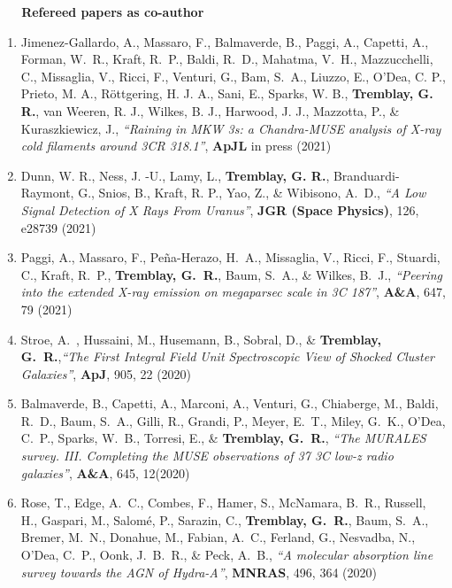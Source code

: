 \documentclass[11pt]{article}
\begin{document}
\vspace{4mm}

\noindent \textbf{~~~Refereed papers as co-author}

\begin{enumerate}[resume]

\item Jimenez-Gallardo, A., Massaro, F., Balmaverde, B., Paggi, A., Capetti, A., Forman, W.~R., Kraft, R.~P., Baldi, R.~D., Mahatma, V.~H., Mazzucchelli, C., Missaglia, V., Ricci, F., Venturi, G., Bam, S.~A., Liuzzo, E., O'Dea, C. P., Prieto, M. A., Röttgering, H. J. A., Sani, E., Sparks, W. B., \textbf{Tremblay, G. R.}, van Weeren, R. J., Wilkes, B. J., Harwood, J. J., Mazzotta, P., \& Kuraszkiewicz, J., \textit{``Raining in MKW 3s: a Chandra-MUSE analysis of X-ray cold filaments around 3CR 318.1''}, \textbf{ApJL} in press (2021)

\item Dunn, W. R., Ness, J. -U., Lamy, L., \textbf{Tremblay, G. R.}, Branduardi-Raymont, G., Snios, B., Kraft, R. P., Yao, Z., \& Wibisono, A.~D., \textit{``A Low Signal Detection of X Rays From Uranus''}, \textbf{JGR (Space Physics)}, 126, e28739 (2021)


\item Paggi, A., Massaro, F., Pe\~{n}a-Herazo, H.~A., Missaglia, V., Ricci, F., Stuardi, C., Kraft, R.~P., \textbf{Tremblay, G.~R.}, Baum, S.~A., \& Wilkes, B.~J., \textit{``Peering into the extended X-ray emission on megaparsec scale in 3C 187''}, \textbf{A\&A}, 647, 79 (2021)


\item Stroe, A.~, Hussaini, M., Husemann, B., Sobral, D., \& \textbf{Tremblay, G.~R.},\textit{``The First Integral Field Unit Spectroscopic View of Shocked Cluster Galaxies''}, \textbf{ApJ}, 905, 22 (2020)

\item Balmaverde, B., Capetti, A., Marconi, A., Venturi, G., Chiaberge, M.,
Baldi, R.~D., Baum, S.~A., Gilli, R., Grandi, P., Meyer, E.~T., Miley, G.~K.,
O'Dea, C.~P., Sparks, W.~B., Torresi, E., \& \textbf{Tremblay, G.~R.},
\textit{``The MURALES survey. III. Completing the MUSE observations of 37 3C low-z radio galaxies''},
\textbf{A\&A}, 645, 12(2020)


\item Rose, T., Edge, A.~C., Combes, F., Hamer, S., McNamara, B.~R.,
Russell, H., Gaspari, M., Salom\'{e}, P., Sarazin, C., \textbf{Tremblay, G.~R.},
Baum, S.~A., Bremer, M.~N., Donahue, M., Fabian, A.~C., Ferland, G.,
Nesvadba, N., O'Dea, C.~P., Oonk, J.~B.~R., \& Peck, A.~B.,
\textit{``A molecular absorption line survey towards the AGN of Hydra-A''},
\textbf{MNRAS}, 496, 364 (2020)



\end{enumerate}
\end{document}
